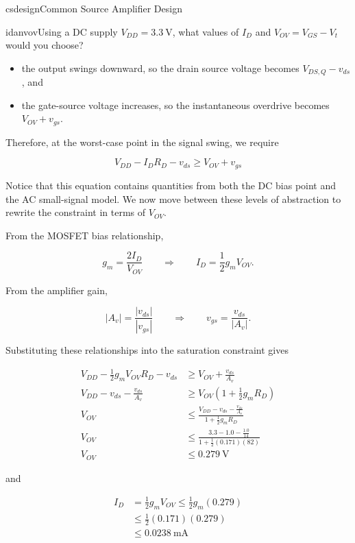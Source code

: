 \begin{mainquestion}{csdesign}{Common Source Amplifier Design}
\begin{partquestion}{idanvov}{Using a DC supply $V_{DD} = 3.3\ \text{V}$, what values of $I_{D}$ and $V_{OV} = V_{GS} - V_{t}$ would you choose?}
\begin{answer}
\begin{kaitlyn}
\begin{itemize}
    \item the output swings downward, so the drain source voltage becomes $V_{DS,Q}-v_{ds}$, and
    \item the gate-source voltage increases, so the instantaneous overdrive becomes $V_{OV}+v_{gs}$.

\end{itemize}

Therefore, at the worst-case point in the signal swing, we require

\[\boxed{V_{DD} - I_D R_D - v_{ds}\geq V_{OV} + v_{gs} }\]

Notice that this equation contains quantities from both the DC bias point and the AC small-signal model. We now move between these levels of abstraction to rewrite the constraint in terms of $V_{OV}$.

From the MOSFET bias relationship,

\[ g_m = \frac{2I_D}{V_{OV}} \qquad\Rightarrow\qquad I_D = \frac{1}{2}g_mV_{OV}.\]

From the amplifier gain,

\[ |A_v| = \frac{|v_{ds}|}{|v_{gs}|} \qquad\Rightarrow\qquad v_{gs} = \frac{v_{ds}}{|A_v|}.\]

Substituting these relationships into the saturation constraint gives
\end{kaitlyn}

\begin{align*}
V_{DD} - \frac{1}{2}g_{m}V_{OV}R_{D} - v_{ds} &\geq V_{OV} + \frac{v_{ds}}{A_{v}} \\
V_{DD} - v_{ds} - \frac{v_{ds}}{A_{v}} &\geq V_{OV}\left(1 + \frac{1}{2}g_{m}R_{D}\right) \\
V_{OV} &\leq \frac{V_{DD} - v_{ds} - \frac{v_{ds}}{A_{v}}}{1 + \frac{1}{2}g_{m}R_{D}}\\
V_{OV} &\leq \frac{3.3 - 1.0 - \frac{1.0}{14}}{1 + \frac{1}{2}(0.171)(82)}\\
V_{OV} &\leq 0.279\ \text{V}
\end{align*}

and

\begin{align*}
    I_D &= \frac{1}{2} g_m V_{OV} \leq \frac{1}{2} g_m (0.279) \\
    &\leq \frac{1}{2} (0.171)(0.279) \\
    &\leq \qty{0.0238}{\milli\ampere} \\
\end{align*}


\end{answer}
\end{partquestion}
\end{mainquestion}
